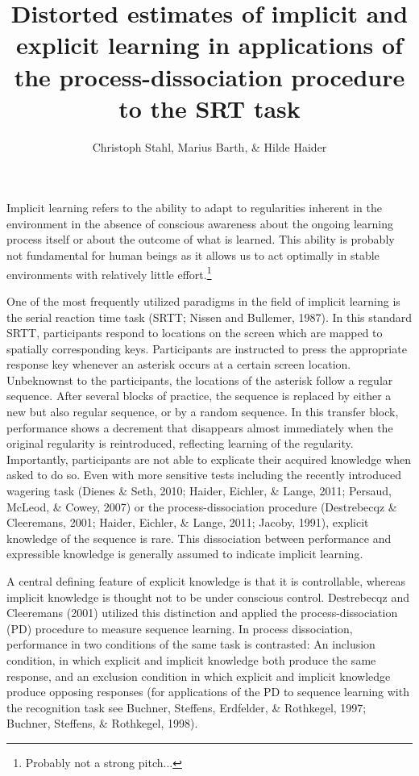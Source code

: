 \documentclass[
  english,
  man]{apa6}
\title{Distorted estimates of implicit and explicit learning in applications of the process-dissociation procedure to the SRT task}
\author{Christoph Stahl\textsuperscript{}, Marius Barth\textsuperscript{}, \& Hilde Haider\textsuperscript{}}
\date{}
\affiliation{\vspace{0.5cm}\textsuperscript{} University of Cologne}
\begin{document}
\maketitle

Implicit learning refers to the ability to adapt to regularities inherent in the environment in the absence of conscious awareness about the ongoing learning process itself or about the outcome of what is learned.
This ability is probably not fundamental for human beings as it allows us to act optimally in stable environments with relatively little effort.\footnote{Probably not a strong pitch...}

One of the most frequently utilized paradigms in the field of implicit learning is the serial reaction time task (SRTT; Nissen and Bullemer, 1987).
In this standard SRTT, participants respond to locations on the screen which are mapped to spatially corresponding keys.
Participants are instructed to press the appropriate response key whenever an asterisk occurs at a certain screen location.
Unbeknownst to the participants, the locations of the asterisk follow a regular sequence.
After several blocks of practice, the sequence is replaced by either a new but also regular sequence, or by a random sequence.
In this transfer block, performance shows a decrement that disappears almost immediately when the original regularity is reintroduced, reflecting learning of the regularity.
Importantly, participants are not able to explicate their acquired knowledge when asked to do so.
Even with more sensitive tests including the recently introduced wagering task (Dienes \& Seth, 2010; Haider, Eichler, \& Lange, 2011; Persaud, McLeod, \& Cowey, 2007) or the process-dissociation procedure (Destrebecqz \& Cleeremans, 2001; Haider, Eichler, \& Lange, 2011; Jacoby, 1991), explicit knowledge of the sequence is rare.
This dissociation between performance and expressible knowledge is generally assumed to indicate implicit learning.

A central defining feature of explicit knowledge is that it is controllable, whereas implicit knowledge is thought not to be under conscious control.
Destrebecqz and Cleeremans (2001) utilized this distinction and applied the process-dissociation (PD) procedure to measure sequence learning.
In process dissociation, performance in two conditions of the same task is contrasted:
An inclusion condition, in which explicit and implicit knowledge both produce the same response, and an exclusion condition in which explicit and implicit knowledge produce opposing responses (for applications of the PD to sequence learning with the recognition task see Buchner, Steffens, Erdfelder, \& Rothkegel, 1997; Buchner, Steffens, \& Rothkegel, 1998).
\end{document}
